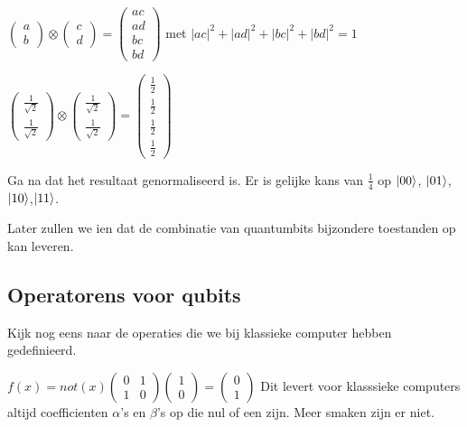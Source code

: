\documentclass[../../main.tex]{subfiles}
\begin{document}
$\begin{pmatrix}
a\\
b
\end{pmatrix}
\otimes
\begin{pmatrix}
c\\
d
\end{pmatrix}
=
\begin{pmatrix}
ac\\
ad\\
bc\\
bd
\end{pmatrix}
$
met $|ac|^2+|ad|^2+|bc|^2+|bd|^2=1$
 
$\begin{pmatrix}
\tfrac{1}{\sqrt{2}}\\
\tfrac{1}{\sqrt{2}}
\end{pmatrix}
\otimes
\begin{pmatrix}
\tfrac{1}{\sqrt{2}}\\
\tfrac{1}{\sqrt{2}}
\end{pmatrix}
=
\begin{pmatrix}
\tfrac{1}{2}\\
\tfrac{1}{2}\\
\tfrac{1}{2}\\
\tfrac{1}{2}
\end{pmatrix}
$

Ga na dat het resultaat genormaliseerd is.
Er is gelijke kans van $\tfrac{1}{4}$ op $\ket{00}$, $\ket{01}$,$\ket{10}$,$\ket{11}$.
 
Later zullen we ien dat de combinatie van quantumbits bijzondere toestanden op kan leveren.  
 
\subsection{Operatorens voor qubits}
Kijk nog eens naar de operaties die we bij klassieke computer hebben gedefinieerd. 

$f(x)=not(x)
\begin{pmatrix}
0&1\\
1&0
\end{pmatrix}
\begin{pmatrix}
1\\
0
\end{pmatrix}
=
\begin{pmatrix}
0\\
1
\end{pmatrix}
$
Dit levert voor klasssieke computers altijd coefficienten $\alpha$'s en $\beta$'s op die nul of een zijn.  Meer smaken zijn er niet. 
\end{document}
